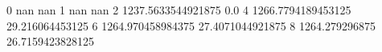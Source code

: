 0 nan nan
1 nan nan
2 1237.5633544921875 0.0
4 1266.7794189453125 29.216064453125
6 1264.970458984375 27.4071044921875
8 1264.279296875 26.7159423828125
